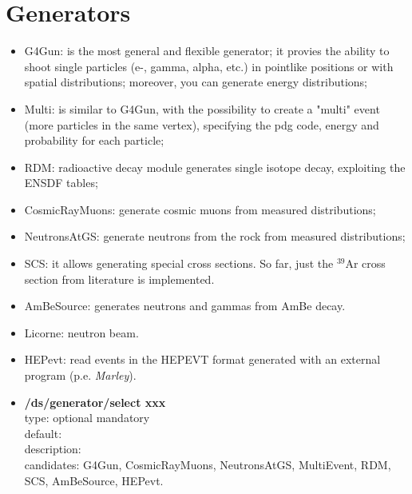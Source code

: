 \documentclass[twocolumn, 10pt]{article}
\begin{document}
\section{Generators}
\begin{itemize}
\item G4Gun: is the most general and flexible generator; it provies the ability to shoot  single particles (e-, gamma, alpha, etc.) in pointlike
positions or with spatial distributions; moreover, you can generate energy distributions;
\item Multi: is similar to G4Gun, with the possibility to create a "multi" event (more particles in the
same vertex), specifying the pdg code, energy and probability for each particle;
\item RDM: radioactive decay module generates single isotope decay, exploiting the ENSDF tables;
\item CosmicRayMuons:  generate cosmic muons from measured distributions;
\item NeutronsAtGS: generate neutrons from the rock from measured distributions; 
\item SCS: it allows generating special cross sections. So far, just the $^{39}$Ar cross section from literature is implemented.
\item AmBeSource: generates neutrons and gammas from AmBe decay. 
\item Licorne: neutron beam. 
\item HEPevt: read events in the HEPEVT format generated with an external program (p.e. \textit{Marley}).
\end{itemize}

\begin{itemize}

\item \textbf{/ds/generator/select xxx}\\
type: optional mandatory\\
default: \\
description: \\
candidates: G4Gun, CosmicRayMuons, NeutronsAtGS, MultiEvent, RDM, SCS, AmBeSource, HEPevt.
\end{itemize}
\end{document}
